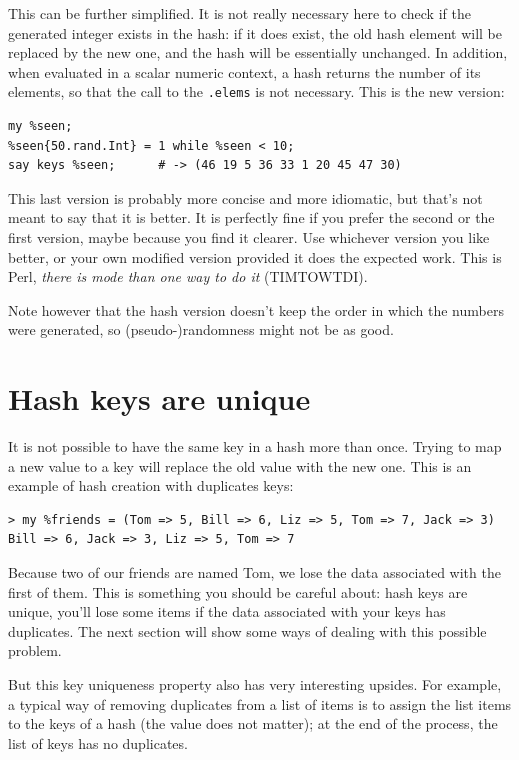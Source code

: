 This can be further simplified. It is not really necessary 
here to check if the generated integer exists in the 
hash: if it does exist, the old hash element will be replaced 
by the new one, and the hash will be essentially unchanged. In 
addition, when evaluated in a scalar numeric context, a 
hash returns the number of its elements, so that the call 
to the {\tt .elems} is not necessary. This is the new version:

\begin{verbatim}
my %seen;
%seen{50.rand.Int} = 1 while %seen < 10;
say keys %seen;      # -> (46 19 5 36 33 1 20 45 47 30)
\end{verbatim}

This last version is probably more concise and more idiomatic, 
but that's not meant to say that it is better. It is 
perfectly fine if you prefer the second or the first version, 
maybe because you find it clearer. Use whichever version you 
like better, or your own modified version provided it does 
the expected work. This is Perl, \emph{there 
is mode than one way to do it} (TIMTOWTDI).

Note however that the hash version doesn't keep the order 
in which the numbers were generated, so (pseudo-)randomness 
might not be as good.


\section{Hash keys are unique}

It is not possible to have the same key in a hash more than once. 
Trying to map a new value to a key will replace the old 
value with the new one. This is an example of hash creation 
with duplicates keys:

\begin{verbatim}
> my %friends = (Tom => 5, Bill => 6, Liz => 5, Tom => 7, Jack => 3)
Bill => 6, Jack => 3, Liz => 5, Tom => 7
\end{verbatim}

Because two of our friends are named Tom, we lose the data 
associated with the first of them. This is something you should 
be careful about: hash keys are unique, you'll lose some items  
if the data associated with your keys has duplicates. The 
next section will show some ways of dealing with this 
possible problem.

But this key uniqueness property also has very interesting upsides. 
For example, a typical way of removing duplicates from a list of 
items is to assign the list items to the keys of a hash (the 
value does not matter); at the end of the process, the list of 
keys has no duplicates.

